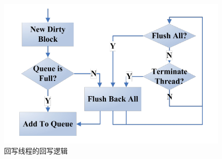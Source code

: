 \begin{figure}
\centering
\includegraphics[width=0.4\linewidth]{./graph/write-back-thread}
\caption{回写线程的回写逻辑}
\label{fig:write-back-thread}
\end{figure}

